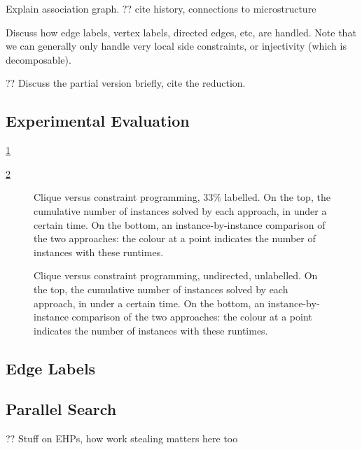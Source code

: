 \documentclass{llncs}
\begin{document}
Explain association graph. ?? cite history, connections to microstructure

Discuss how edge labels, vertex labels, directed edges, etc, are handled. Note that we can generally
only handle very local side constraints, or injectivity (which is decomposable).

?? Discuss the partial version briefly, cite the reduction.

\subsection{Experimental Evaluation}

\cref{figure:unconnected-33}

\cref{figure:unconnected-plain}

\begin{figure}[p]
    \centering
    
    \caption{Clique versus constraint programming, 33\% labelled. On the top, the cumulative
    number of instances solved by each approach, in under a certain time. On the bottom, an
    instance-by-instance comparison of the two approaches: the colour at a point indicates the
    number of instances with these runtimes.} \label{figure:unconnected-33}
\end{figure}

\begin{figure}[p]
    \centering
    
    \caption{Clique versus constraint programming, undirected, unlabelled. On the top, the cumulative
    number of instances solved by each approach, in under a certain time. On the bottom, an
        instance-by-instance comparison of the two approaches: the colour at a point indicates the
    number of instances with these runtimes.} \label{figure:unconnected-plain}
\end{figure}

\subsection{Edge Labels}

\subsection{Parallel Search}

\cite{DBLP:journals/jcc/KoncDTRJ12,DBLP:journals/algorithms/McCreeshP13,DBLP:journals/topc/McCreeshP15,DBLP:journals/cor/SegundoLP16}

?? Stuff on EHPs, how work stealing matters here too \cite{DBLP:journals/jco/BatsynGMP14}
\end{document}
